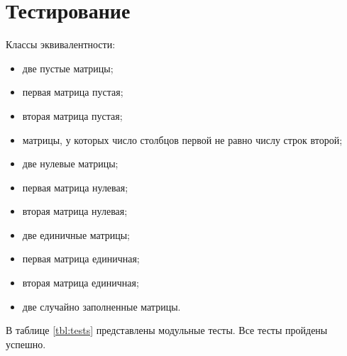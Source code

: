 \section{Тестирование}
Классы эквивалентности:

\begin{itemize}
    \item две пустые матрицы;
    \item первая матрица пустая;
    \item вторая матрица пустая;
    \item матрицы, у которых число столбцов первой не равно числу строк второй;
    \item две нулевые матрицы;
    \item первая матрица нулевая;
    \item вторая матрица нулевая;
    \item две единичные матрицы;
    \item первая матрица единичная;
    \item вторая матрица единичная;
    \item две случайно заполненные матрицы.
\end{itemize}

В таблице \ref{tbl:tests} представлены модульные тесты. Все тесты пройдены успешно.

